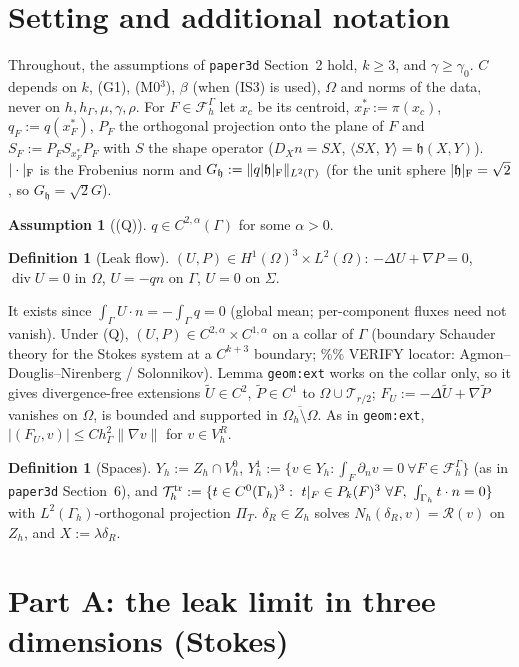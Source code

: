 \documentclass[11pt,reqno]{amsart}
\theoremstyle{plain}
\theoremstyle{definition}
\newtheorem{definition}[theorem]{Definition}
\newtheorem{assumption}[theorem]{Assumption}
\newcommand{\hG}{h_\Gamma}
\newcommand{\Gh}{\Gamma_h}
\newcommand{\Oh}{\Omega_h}
\newcommand{\FG}{\mathcal F_h^\Gamma}
\newcommand{\VR}{V_h^R}
\newcommand{\VO}{V_h^0}
\newcommand{\Zh}{Z_h}
\newcommand{\dn}{\partial_n}
\newcommand{\ip}[2]{\langle #1,\, #2\rangle}
\newcommand{\norm}[1]{\lVert #1\rVert}
\renewcommand{\div}{\operatorname{div}}
\newcommand{\Rc}{\mathcal R}
\newcommand{\hh}{\mathfrak h}
\newcommand{\Ut}{\tilde U}
\newcommand{\Pt}{\tilde P}
\newcommand{\Yh}{Y_h}
\newcommand{\Tr}{\mathcal T^{\rm tr}_h}
\begin{document}
\section{Setting and additional notation}\label{sec:set}
Throughout, the assumptions of \texttt{paper3d} Section~2 hold, $k\ge3$, and $\gamma\ge\gamma_0$. $C$ depends on $k$, (G1), (M0$^3$), $\beta$ (when (IS3) is used), $\Omega$ and norms of the data, never on $h,\hG,\mu,\gamma,\rho$. For $F\in\FG$ let $x_c$ be its centroid, $x_F^\ast:=\pi(x_c)$, $q_F:=q(x^\ast_F)$, $P_F$ the orthogonal projection onto the plane of $F$ and $S_F:=P_FS_{x^\ast_F}P_F$ with $S$ the shape operator ($D_Xn=SX$, $\ip{SX}Y=\hh(X,Y)$). $|\cdot|_{\rm F}$ is the Frobenius norm and $G_\hh:=\norm{q|\hh|_{\rm F}}_{L^2(\Gamma)}$ (for the unit sphere $|\hh|_{\rm F}=\sqrt2$, so $G_\hh=\sqrt2G$).

\begin{assumption}[(Q)]\label{set:Q}
$q\in C^{2,\alpha}(\Gamma)$ for some $\alpha>0$.
\end{assumption}

\begin{definition}[Leak flow]\label{set:U}
$(U,P)\in H^1(\Omega)^3\times L^2(\Omega)$: $-\Delta U+\nabla P=0$, $\div U=0$ in $\Omega$, $U=-qn$ on $\Gamma$, $U=0$ on $\Sigma$.
\end{definition}
It exists since $\int_\Gamma U\cdot n=-\int_\Gamma q=0$ (global mean; per-component fluxes need not vanish). Under (Q), $(U,P)\in C^{2,\alpha}\times C^{1,\alpha}$ on a collar of $\Gamma$ (boundary Schauder theory for the Stokes system at a $C^{k+3}$ boundary; \%\% VERIFY locator: Agmon--Douglis--Nirenberg / Solonnikov). Lemma \texttt{geom:ext} works on the collar only, so it gives divergence-free extensions $\Ut\in C^2$, $\Pt\in C^1$ to $\Omega\cup\mathcal T_{r/2}$; $F_U:=-\Delta\Ut+\nabla\Pt$ vanishes on $\Omega$, is bounded and supported in $\overline{\Oh\setminus\Omega}$. As in \texttt{geom:ext}, $|(F_U,v)|\le C\hG^2\norm{\nabla v}$ for $v\in\VR$.

\begin{definition}[Spaces]\label{set:sp}
$\Yh:=\Zh\cap\VO$, $\Yh^1:=\{v\in\Yh:\int_F\dn v=0\ \forall F\in\FG\}$ (as in \texttt{paper3d} Section~6), and $\Tr:=\{t\in C^0(\Gh)^3:\ t|_F\in P_k(F)^3\ \forall F,\ \int_{\Gh}t\cdot n=0\}$ with $L^2(\Gh)$-orthogonal projection $\Pi_T$. $\delta_R\in\Zh$ solves $N_h(\delta_R,v)=\Rc(v)$ on $\Zh$, and $X:=\lambda\delta_R$.
\end{definition}

\section{Part A: the leak limit in three dimensions (Stokes)}\label{sec:A}
\end{document}

